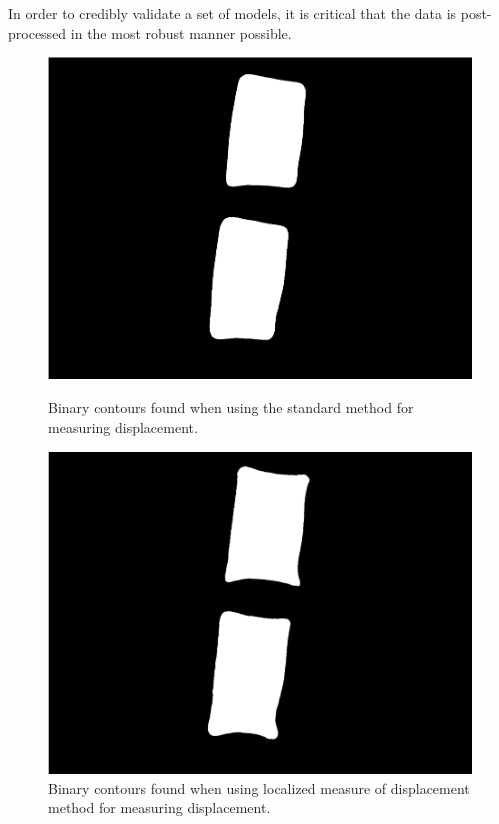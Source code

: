In order to credibly validate a set of models, it is critical that the data is post-processed in the most robust manner possible.

\begin{figure}
    \centering
    \begin{minipage}{0.48\textwidth}
        \centering
        \includegraphics[width=\textwidth]{Chapter2/Figs/Raster/binary_contours.png} %
        \caption{Binary contours found when using the standard method for measuring displacement.}\label{binary_contour}
    \end{minipage}\hfill
    \begin{minipage}{0.48\textwidth}
        \centering
        \includegraphics[width=\textwidth]{Chapter2/Figs/Raster/adaptive_contours.png} %
        \caption{Binary contours found when using localized measure of displacement method for measuring displacement.}\label{adaptive_contour}
    \end{minipage}
\end{figure}

